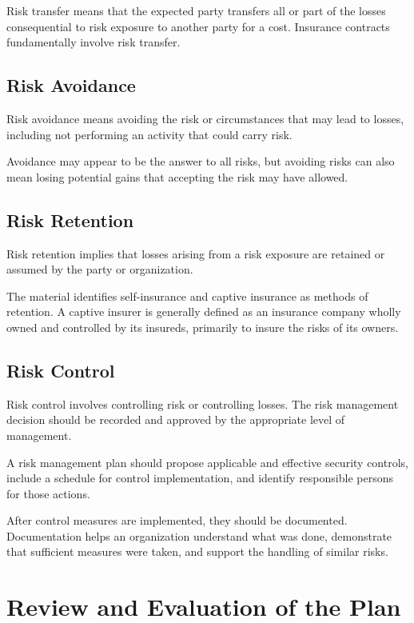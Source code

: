 \documentclass[
]{book}
\begin{document}
Risk transfer means that the expected party transfers all or part of the losses consequential to risk exposure to another party for a cost. Insurance contracts fundamentally involve risk transfer.

\subsection{Risk Avoidance}\label{risk-avoidance}

Risk avoidance means avoiding the risk or circumstances that may lead to losses, including not performing an activity that could carry risk.

Avoidance may appear to be the answer to all risks, but avoiding risks can also mean losing potential gains that accepting the risk may have allowed.

\subsection{Risk Retention}\label{risk-retention}

Risk retention implies that losses arising from a risk exposure are retained or assumed by the party or organization.

The material identifies self-insurance and captive insurance as methods of retention. A captive insurer is generally defined as an insurance company wholly owned and controlled by its insureds, primarily to insure the risks of its owners.

\subsection{Risk Control}\label{risk-control}

Risk control involves controlling risk or controlling losses. The risk management decision should be recorded and approved by the appropriate level of management.

A risk management plan should propose applicable and effective security controls, include a schedule for control implementation, and identify responsible persons for those actions.

After control measures are implemented, they should be documented. Documentation helps an organization understand what was done, demonstrate that sufficient measures were taken, and support the handling of similar risks.

\section{Review and Evaluation of the Plan}\label{review-and-evaluation-of-the-plan}
\end{document}
